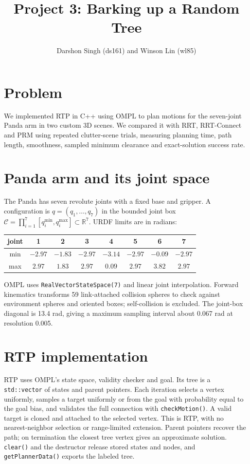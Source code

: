 \documentclass{comp450}
\title{Project 3: Barking up a Random Tree}
\author{Darshon Singh (ds161) and Winson Lin (wl85)}
\begin{document}
\maketitle

\section*{Problem}

We implemented RTP in C++ using OMPL to plan motions for the seven-joint Panda arm in two custom 3D scenes. We compared it with RRT, RRT-Connect and PRM using repeated clutter-scene trials, measuring planning time, path length, smoothness, sampled minimum clearance and exact-solution success rate.

\section*{Panda arm and its joint space}

The Panda has seven revolute joints with a fixed base and gripper. A configuration is $q=(q_1,\dots,q_7)$ in the bounded joint box $\mathcal{C}=\prod_{i=1}^{7}[q_i^{\min},q_i^{\max}]\subset\mathbb{R}^7$. URDF limits are in radians:

\begin{center}
\small
\begin{tabular}{cccccccc}
\toprule
joint & 1 & 2 & 3 & 4 & 5 & 6 & 7 \\
\midrule
min & $-2.97$ & $-1.83$ & $-2.97$ & $-3.14$ & $-2.97$ & $-0.09$ & $-2.97$ \\
max & $2.97$ & $1.83$ & $2.97$ & $0.09$ & $2.97$ & $3.82$ & $2.97$ \\
\bottomrule
\end{tabular}
\end{center}

OMPL uses \texttt{RealVectorStateSpace(7)} and linear joint interpolation. Forward kinematics transforms 59 link-attached collision spheres to check against environment spheres and oriented boxes; self-collision is excluded. The joint-box diagonal is 13.4 rad, giving a maximum sampling interval about 0.067 rad at resolution 0.005.

\section*{RTP implementation}

RTP uses OMPL's state space, validity checker and goal. Its tree is a \texttt{std::vector} of states and parent pointers. Each iteration selects a vertex uniformly, samples a target uniformly or from the goal with probability equal to the goal bias, and validates the full connection with \texttt{checkMotion()}. A valid target is cloned and attached to the selected vertex. This is RTP, with no nearest-neighbor selection or range-limited extension. Parent pointers recover the path; on termination the closest tree vertex gives an approximate solution. \texttt{clear()} and the destructor release stored states and nodes, and \texttt{getPlannerData()} exports the labeled tree.
\end{document}
